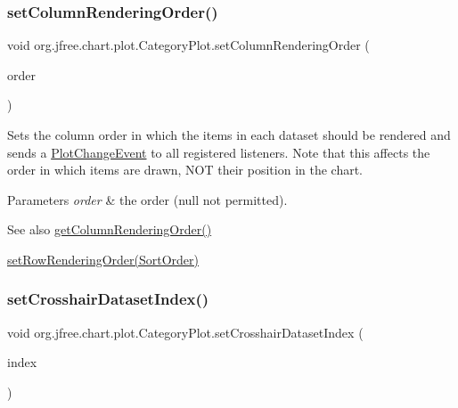 \subsubsection{\texorpdfstring{set\+Column\+Rendering\+Order()}{setColumnRenderingOrder()}}
{\footnotesize\ttfamily void org.\+jfree.\+chart.\+plot.\+Category\+Plot.\+set\+Column\+Rendering\+Order (\begin{DoxyParamCaption}\item[{Sort\+Order}]{order }\end{DoxyParamCaption})}

Sets the column order in which the items in each dataset should be rendered and sends a \mbox{\hyperlink{}{Plot\+Change\+Event}} to all registered listeners. Note that this affects the order in which items are drawn, N\+OT their position in the chart.


\begin{DoxyParams}{Parameters}
{\em order} & the order ({\ttfamily null} not permitted).\\
\hline
\end{DoxyParams}
\begin{DoxySeeAlso}{See also}
\mbox{\hyperlink{classorg_1_1jfree_1_1chart_1_1plot_1_1_category_plot_aa917b1012005f1b7ca9766c1e7b693bd}{get\+Column\+Rendering\+Order()}} 

\mbox{\hyperlink{classorg_1_1jfree_1_1chart_1_1plot_1_1_category_plot_ac4324fcc47e9e5a7b37a7bed1284c656}{set\+Row\+Rendering\+Order(\+Sort\+Order)}} 
\end{DoxySeeAlso}
\mbox{\label{classorg_1_1jfree_1_1chart_1_1plot_1_1_category_plot_ab08947ce94aa16fbce3bca12a55e0b42}} 
\subsubsection{\texorpdfstring{set\+Crosshair\+Dataset\+Index()}{setCrosshairDatasetIndex()}\hspace{0.1cm}{\footnotesize\ttfamily [1/2]}}
{\footnotesize\ttfamily void org.\+jfree.\+chart.\+plot.\+Category\+Plot.\+set\+Crosshair\+Dataset\+Index (\begin{DoxyParamCaption}\item[{int}]{index }\end{DoxyParamCaption})}


